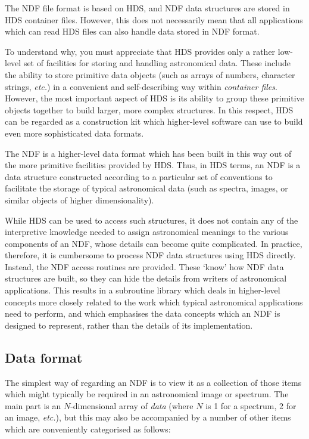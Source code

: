 The NDF file format is based on HDS, and NDF data structures are stored in HDS
container files.
However, this does not necessarily mean that all applications which can read
HDS files can also handle data stored in NDF format. 

To understand why, you must appreciate that HDS provides only a rather low-level
set of facilities for storing and handling astronomical data.
These include the ability to store primitive data objects (such as arrays of
numbers, character strings, {\em etc.}) in a convenient and self-describing
way within {\em container files}.
However, the most important aspect of HDS is its ability to group these
primitive objects together to build larger, more complex structures. 
In this respect, HDS can be regarded as a construction kit which higher-level
software can use to build even more sophisticated data formats.

The NDF is a higher-level data format which has been built in this way out of
the more primitive facilities provided by HDS.
Thus, in HDS terms, an NDF is a data structure constructed according to a
particular set of conventions to facilitate the storage of typical
astronomical data (such as spectra, images, or similar objects of higher
dimensionality). 

While HDS can be used to access such structures, it does not contain any of
the interpretive knowledge needed to assign astronomical meanings to the
various components of an NDF, whose details can become quite complicated. 
In practice, therefore, it is cumbersome to process NDF data structures using
HDS directly. 
Instead, the NDF access routines are provided.
These `know' how NDF data structures are built, so they can hide the details
from writers of astronomical applications.
This results in a subroutine library which deals in higher-level concepts
more closely related to the work which typical astronomical applications
need to perform, and which emphasises the data concepts which an NDF is
designed to represent, rather than the details of its implementation. 

\subsection{Data format}

The simplest way of regarding an NDF is to view it as a collection of those
items which might typically be required in an astronomical image or spectrum. 
The main part is an $N$-dimensional array of {\em data\/} (where $N$ is 1 for a
spectrum, 2 for an image, {\em etc.}), but this may also be accompanied by a
number of other items which are conveniently categorised as follows: 


